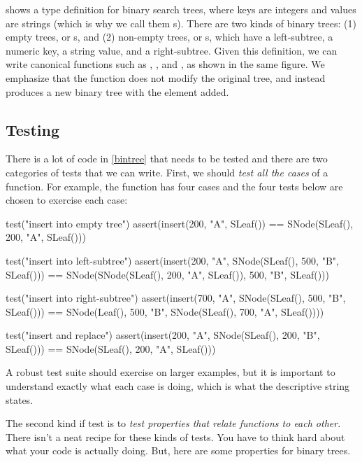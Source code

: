 \documentclass{book}
\begin{document}
 shows a type definition for binary search trees, where
keys are integers and values are strings (which is why we call them
s). There are two
kinds of binary trees: (1) empty trees, or s, and (2)
non-empty trees, or s, which have a left-subtree,
a numeric key, a string value, and a right-subtree.
Given this definition, we can write canonical functions such
as , , and ,
as shown in the same figure.
We emphasize that the  function does not modify the
original tree, and instead produces a new binary tree with the element added.


\subsection{Testing}

There is a lot of code in \cref{bintree} that needs to be tested and there
are two categories of tests that we can write. First, we should \emph{test all the
cases} of a function. For example, the  function has
four cases and the four tests below are chosen to exercise each case:
\begin{scalacode}
test("insert into empty tree") {
  assert(insert(200, "A", SLeaf()) == SNode(SLeaf(), 200, "A", SLeaf()))
}

test("insert into left-subtree") {
  assert(insert(200, "A", SNode(SLeaf(), 500, "B", SLeaf()))
    == SNode(SNode(SLeaf(), 200, "A", SLeaf()), 500, "B", SLeaf()))
}

test("insert into right-subtree") {
  assert(insert(700, "A", SNode(SLeaf(), 500, "B", SLeaf()))
    == SNode(Leaf(), 500, "B", SNode(SLeaf(), 700, "A", SLeaf())))
}

test("insert and replace") {
  assert(insert(200, "A", SNode(SLeaf(), 200, "B", SLeaf()))
    == SNode(SLeaf(), 200, "A", SLeaf()))
}
\end{scalacode}

A robust test suite should exercise  on larger examples, but
it is important to understand exactly what each case is doing, which is what the
descriptive string states.

The second kind if test is to \emph{test properties that relate functions
to each other}. There isn't a neat recipe for these kinds of tests. You have
to think hard about what your code is actually doing. But, here
are some properties for binary trees.
\end{document}
